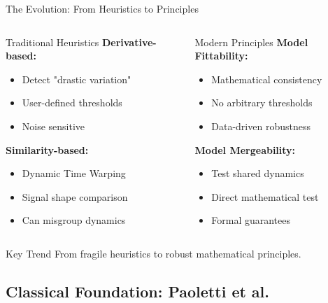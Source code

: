 \documentclass[aspectratio=169]{beamer}
\begin{document}
\begin{frame}{The Evolution: From Heuristics to Principles}
\begin{columns}[t]
\begin{column}{0.5\textwidth}
\begin{block}{Traditional Heuristics}
\textbf{Derivative-based:}
\begin{itemize}
\item Detect "drastic variation"
\item User-defined thresholds
\item Noise sensitive
\end{itemize}

\textbf{Similarity-based:}
\begin{itemize}
\item Dynamic Time Warping
\item Signal shape comparison
\item Can misgroup dynamics
\end{itemize}
\end{block}
\end{column}
\begin{column}{0.5\textwidth}
\begin{block}{Modern Principles}
\textbf{Model Fittability:}
\begin{itemize}
\item Mathematical consistency
\item No arbitrary thresholds
\item Data-driven robustness
\end{itemize}

\textbf{Model Mergeability:}
\begin{itemize}
\item Test shared dynamics
\item Direct mathematical test
\item Formal guarantees
\end{itemize}
\end{block}
\end{column}
\end{columns}

\vspace{0.3cm}
\begin{alertblock}{Key Trend}
From fragile heuristics to robust mathematical principles.
\end{alertblock}
\end{frame}

\subsection{Classical Foundation: Paoletti et al.}
\end{document}
